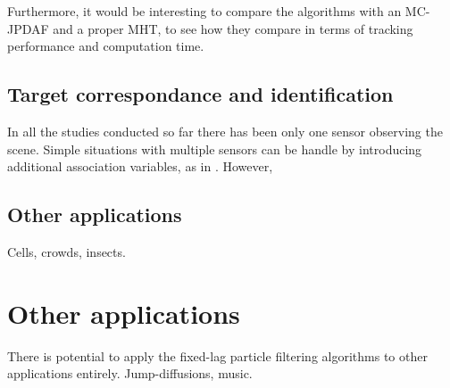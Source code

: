 Furthermore, it would be interesting to compare the algorithms with an MC-JPDAF and a proper MHT, to see how they compare in terms of tracking performance and computation time.



\subsection{Target correspondance and identification}
In all the studies conducted so far there has been only one sensor observing the scene. Simple situations with multiple sensors can be handle by introducing additional association variables, as in \cite{Vermaak2005}. However, 



\subsection{Other applications}
Cells, crowds, insects.




\section{Other applications}
There is potential to apply the fixed-lag particle filtering algorithms to other applications entirely.
Jump-diffusions, music.